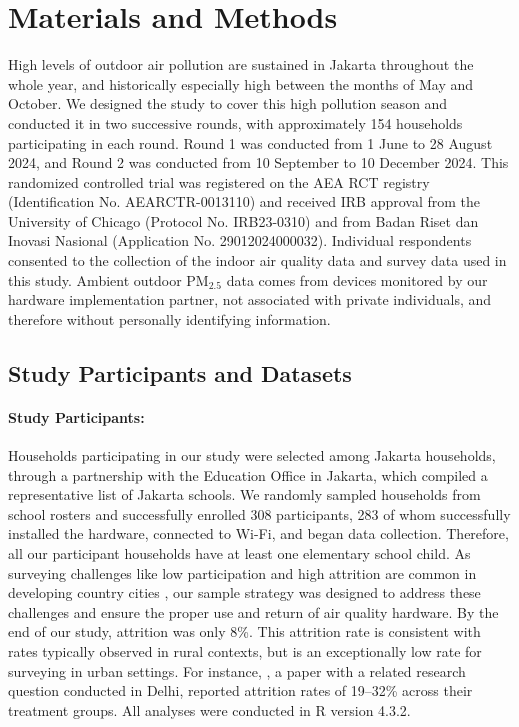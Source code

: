 \documentclass[9pt,twocolumn,twoside]{pnas-new}
\begin{document}
\section{Materials and Methods} \label{sec:methods}
High levels of outdoor air pollution are sustained in Jakarta throughout the whole year, and historically especially high between the months of May and October. We designed the study to cover this high pollution season and conducted it in two successive rounds, with approximately 154 households participating in each round. Round 1 was conducted from 1 June to 28 August 2024, and Round 2 was conducted from 10 September to 10 December 2024. This randomized controlled trial was registered on the AEA RCT registry (Identification No. AEARCTR-0013110) and received IRB approval from the University of Chicago (Protocol No. IRB23-0310) and from Badan Riset dan Inovasi Nasional (Application No. 29012024000032).
Individual respondents consented to the collection of the indoor air quality data and survey data used in this study. Ambient outdoor PM$_{2.5}$ data comes from devices monitored by our hardware implementation partner, not associated with private individuals, and therefore without personally identifying information.


\subsection{Study Participants and Datasets}
\label{ssec:methods_sampling}

\paragraph{Study Participants:} Households participating in our study were selected among Jakarta households, through a partnership with the Education Office in Jakarta, which compiled a representative list of Jakarta schools. We randomly sampled households from school rosters and successfully enrolled 308 participants, 283 of whom successfully installed the hardware, connected to Wi-Fi, and began data collection. Therefore, all our participant households have at least one elementary school child. As surveying challenges like low participation and high attrition are common in developing country cities \citep{greenstone_indoor_2021}, our sample strategy was designed to address these challenges and ensure the proper use and return of air quality hardware. By the end of our study, attrition was only 8\%. This attrition rate is consistent with rates typically observed in rural contexts, but is an exceptionally low rate for surveying in urban settings. For instance, \citep{greenstone_indoor_2021}, a paper with a related research question conducted in Delhi, reported attrition rates of 19–32\% across their treatment groups. All analyses were conducted in R version 4.3.2.
\end{document}
